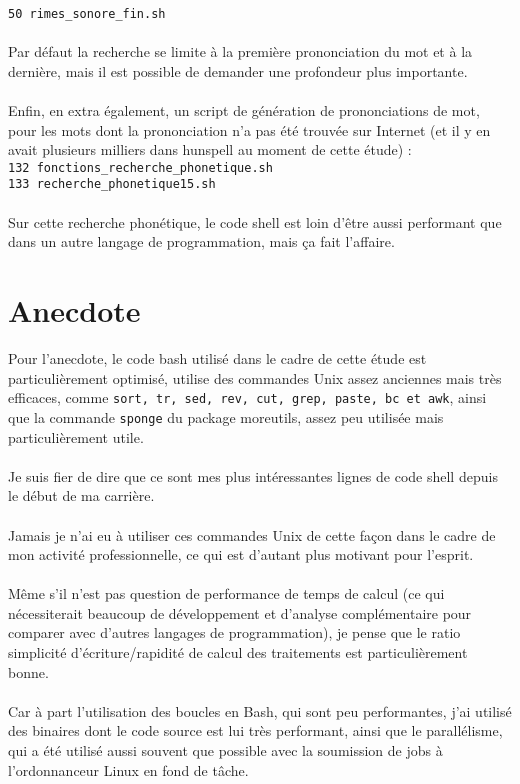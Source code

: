 \documentclass[french]{article}
\begin{document}
\begin{appendix}
\texttt{50 rimes\_sonore\_fin.sh}\\
\\Par défaut la recherche se limite à la première prononciation du mot et à la dernière, mais il est possible de demander une profondeur plus importante.\\
\\Enfin, en extra également, un script de génération de prononciations de mot, pour les mots dont la prononciation n'a pas été trouvée sur Internet (et il y en avait plusieurs milliers dans hunspell au moment de cette étude) :\\
\texttt{132 fonctions\_recherche\_phonetique.sh}\\
\texttt{133 recherche\_phonetique15.sh}\\
\\Sur cette recherche phonétique, le code shell est loin d'être aussi performant que dans un autre langage de programmation, mais ça fait l'affaire.\\
\section{Anecdote}
Pour l'anecdote, le code bash utilisé dans le cadre de cette étude est particulièrement optimisé, utilise des commandes Unix assez anciennes mais très efficaces, comme \texttt{sort, tr, sed, rev, cut, grep, paste, bc et awk}, ainsi que la commande \texttt{sponge} du package moreutils, assez peu utilisée mais particulièrement utile.\\
\\
Je suis fier de dire que ce sont mes plus intéressantes lignes de code shell depuis le début de ma carrière.\\
\\
Jamais je n'ai eu à utiliser ces commandes Unix de cette façon dans le cadre de mon activité professionnelle, ce qui est d'autant plus motivant pour l'esprit.\\
\\
Même s'il n'est pas question de performance de temps de calcul (ce qui nécessiterait beaucoup de développement et d'analyse complémentaire pour comparer avec d'autres langages de programmation), je pense que le ratio simplicité d'écriture/rapidité de calcul des traitements est particulièrement bonne.\\
\\
Car à part l'utilisation des boucles en Bash, qui sont peu performantes, j'ai utilisé des binaires dont le code source est lui très performant, ainsi que le parallélisme, qui a été utilisé aussi souvent que possible avec la soumission de jobs à l'ordonnanceur Linux en fond de tâche.\\

\end{appendix}
\end{document}
